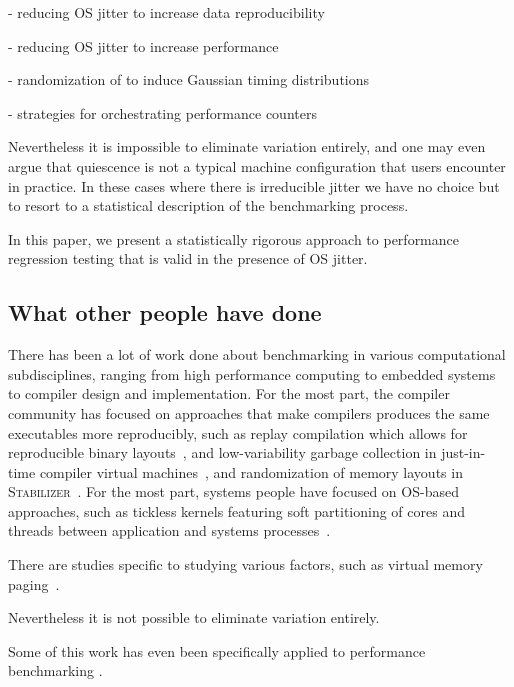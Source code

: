 \documentclass[conference]{IEEEtran}
\begin{document}
- reducing OS jitter to increase data reproducibility

- reducing OS jitter to increase performance

- randomization of  to induce Gaussian timing distributions

- strategies for orchestrating performance counters

Nevertheless it is impossible to eliminate variation
entirely, and one may even argue that quiescence is not a typical machine
configuration that users encounter in practice.
In these cases where there is irreducible jitter we have no choice but to resort to a statistical description of the benchmarking process.

In this paper, we present a statistically rigorous approach to performance regression
testing that is valid in the presence of OS jitter.



\subsection{What other people have done}

There has been a lot of work done about benchmarking in various computational subdisciplines, ranging from high performance computing to embedded systems to compiler design and implementation. For the most part, the compiler community has focused on approaches that make compilers produces the same executables more reproducibly, such as replay compilation which allows for reproducible binary layouts~\cite{Georges2008}, and low-variability garbage collection in just-in-time compiler virtual machines~\cite{Huang2004}, and randomization of memory layouts in \textsc{Stabilizer}~\cite{Curtsinger2013}. For the most part, systems people have focused on OS-based approaches, such as tickless kernels featuring soft partitioning of cores and threads between application and systems processes~\cite{Akkan2012}.

There are studies specific to studying various factors, such as virtual memory paging~\cite{Oyama2014,Oyama2016}.

Nevertheless it is not possible to eliminate variation entirely.

Some of this work has even been specifically applied to performance benchmarking \cite{Alcocer2015,Barrett2016}.
\end{document}
